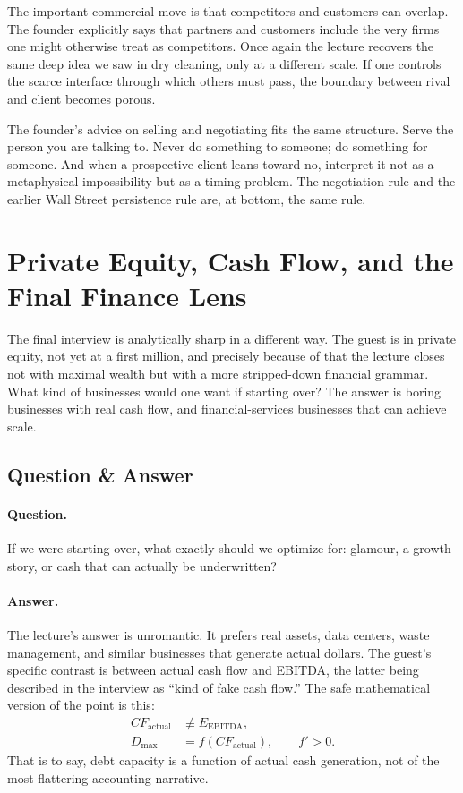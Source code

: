 The important commercial move is that competitors and customers can overlap. The founder explicitly says that partners and customers include the very firms one might otherwise treat as competitors. Once again the lecture recovers the same deep idea we saw in dry cleaning, only at a different scale. If one controls the scarce interface through which others must pass, the boundary between rival and client becomes porous.

The founder's advice on selling and negotiating fits the same structure. Serve the person you are talking to. Never do something to someone; do something for someone. And when a prospective client leans toward no, interpret it not as a metaphysical impossibility but as a timing problem. The negotiation rule and the earlier Wall Street persistence rule are, at bottom, the same rule.

\section{Private Equity, Cash Flow, and the Final Finance Lens}

The final interview is analytically sharp in a different way. The guest is in private equity, not yet at a first million, and precisely because of that the lecture closes not with maximal wealth but with a more stripped-down financial grammar. What kind of businesses would one want if starting over? The answer is boring businesses with real cash flow, and financial-services businesses that can achieve scale.

\subsection{Question \& Answer}

\paragraph{Question.} If we were starting over, what exactly should we optimize for: glamour, a growth story, or cash that can actually be underwritten?

\paragraph{Answer.} The lecture's answer is unromantic. It prefers real assets, data centers, waste management, and similar businesses that generate actual dollars. The guest's specific contrast is between actual cash flow and EBITDA, the latter being described in the interview as ``kind of fake cash flow.'' The safe mathematical version of the point is this:
\begin{align}
CF_{\text{actual}} &\not\equiv E_{\text{EBITDA}}, \\
D_{\max} &= f(CF_{\text{actual}}), \qquad f' > 0.
\end{align}
That is to say, debt capacity is a function of actual cash generation, not of the most flattering accounting narrative.

